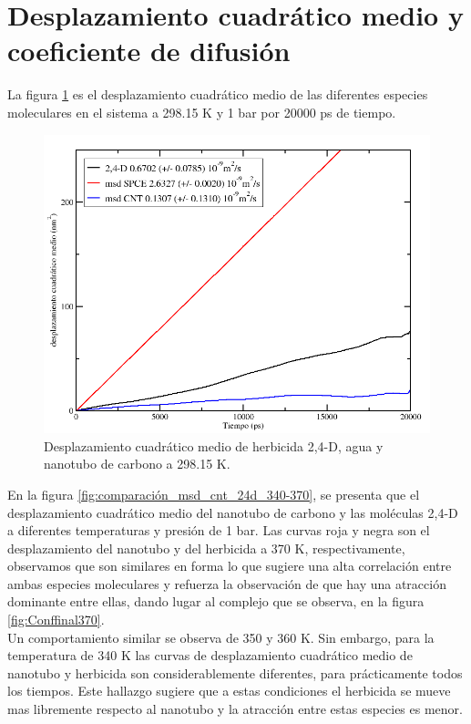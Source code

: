 \section{Desplazamiento cuadrático medio y coeficiente de difusión}

La figura \ref{fig:msd_all_298} es el desplazamiento cuadrático medio de las diferentes especies moleculares en el sistema a 298.15 K y 1 bar por 20000 ps de tiempo.

\begin{figure}[!h]
    \centering
    \includegraphics[width=.8\textwidth,keepaspectratio=true]{resultados/msd_all_29815.png}
    \caption{Desplazamiento cuadrático medio de herbicida 2,4-D, agua y nanotubo de carbono a 298.15 K.}
    \label{fig:msd_all_298}
\end{figure}

En la figura \ref{fig:comparación_msd_cnt_24d_340-370}, se presenta que el desplazamiento cuadrático medio del nanotubo de carbono y las moléculas 2,4-D a diferentes temperaturas y presión de 1 bar. Las curvas roja y negra son el desplazamiento del nanotubo y del herbicida a 370 K, respectivamente, observamos que son similares en forma lo que sugiere una alta correlación entre ambas especies moleculares y refuerza la observación de que hay una atracción dominante entre ellas, dando lugar al complejo que se observa, en la figura \ref{fig:Conffinal370}. \\

Un comportamiento similar se observa de 350 y 360 K. Sin embargo, para la temperatura de 340 K las curvas de desplazamiento cuadrático medio de nanotubo y herbicida son considerablemente diferentes, para prácticamente todos los tiempos. Este hallazgo sugiere que a estas condiciones el herbicida se mueve mas libremente respecto al nanotubo y la atracción entre estas especies es menor.\\

